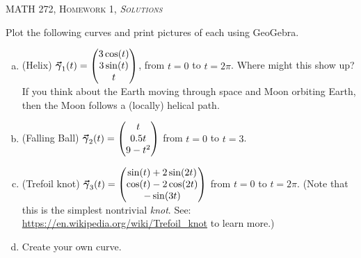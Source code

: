 \documentclass[12pt]{article} %
\begin{document}
\begin{center}
   \textsc{\large MATH 272, Homework 1, \emph{Solutions}}\\
\end{center}
\vspace{.5cm}

\begin{problem}
Plot the following curves and print pictures of each using GeoGebra.
\begin{enumerate}[(a)]
	\item (Helix) $\boldsymbol{\vec{\gamma}}_1(t) = \begin{pmatrix} 3\cos(t) \\ 3\sin(t) \\ t\end{pmatrix}$, from $t=0$ to $t=2\pi$. Where might this show up? If you think about the Earth moving through space and Moon orbiting Earth, then the Moon follows a (locally) helical path.

	\item (Falling Ball) $\boldsymbol{\vec{\gamma}}_2(t) = \begin{pmatrix} t\\  0.5t \\ 9-t^2 \end{pmatrix}$ from $t=0$ to $t=3$.

	\item (Trefoil knot) $\boldsymbol{\vec{\gamma}}_3(t) = \begin{pmatrix} \sin(t)+2\sin(2t) \\ \cos(t)-2\cos(2t) \\ -\sin(3t) \end{pmatrix}$ from $t=0$ to $t=2\pi$. (Note that this is the simplest nontrivial \emph{knot}. See: \url{https://en.wikipedia.org/wiki/Trefoil_knot} to learn more.)

	\item Create your own curve.
\end{enumerate}
\end{problem}
\end{document}
